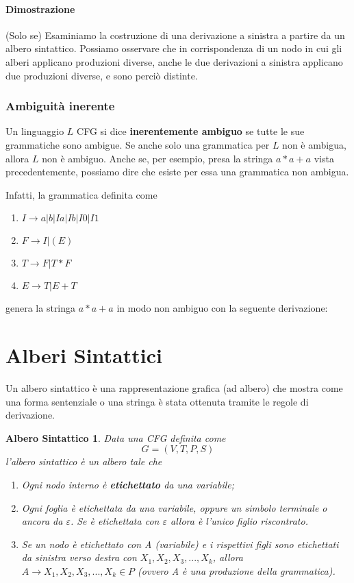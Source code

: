 \documentclass[11pt]{article}
\newtheorem{alberoSintattico}{Albero Sintattico}
\begin{document}
\paragraph{Dimostrazione} (Solo se) Esaminiamo la costruzione di una derivazione a sinistra a partire da un albero sintattico. Possiamo osservare che in corrispondenza di un nodo in cui gli alberi applicano produzioni diverse, anche le due derivazioni a sinistra applicano due produzioni diverse, e sono perciò distinte.

\subsubsection{Ambiguità inerente}
 Un linguaggio $L$ CFG si dice \textbf{inerentemente ambiguo} se tutte le sue grammatiche sono ambigue. Se anche solo una grammatica per $L$ non è ambigua, allora $L$ non è ambiguo. Anche se, per esempio, presa la stringa $a*a+a$ vista precedentemente, possiamo dire che esiste per essa una grammatica non ambigua.
 
 Infatti, la grammatica definita come
 \begin{enumerate}
 	\item $I \rightarrow a|b|Ia|Ib|I0|I1$
 	\item $F \rightarrow I|(E)$
 	\item $T \rightarrow F | T*F$
 	\item $E \rightarrow T|E+T$
\end{enumerate}
genera la stringa $a*a+a$ in modo non ambiguo con la seguente derivazione:
  

\section{Alberi Sintattici}
Un albero sintattico è una rappresentazione grafica (ad albero) che mostra come una forma sentenziale o una stringa è stata ottenuta tramite le regole di derivazione.

\begin{alberoSintattico}
Data una CFG definita come $$G=(V,T,P,S)$$ l'albero sintattico è un albero tale che
\begin{enumerate}
	\item Ogni nodo interno è \textbf{etichettato} da una variabile;
	\item Ogni foglia è etichettata da una variabile, oppure un simbolo terminale o ancora da $\varepsilon$. Se è etichettata con $\varepsilon$ allora è l'unico figlio riscontrato.
	\item Se un nodo è etichettato con A (variabile) e i rispettivi figli sono etichettati da sinistra verso destra con $X_1,X_2,X_3,...,X_k$, allora $A \rightarrow X_1,X_2,X_3,...,X_k \in P$ (ovvero A è una produzione della grammatica).
\end{enumerate}
\end{alberoSintattico}
\end{document}
